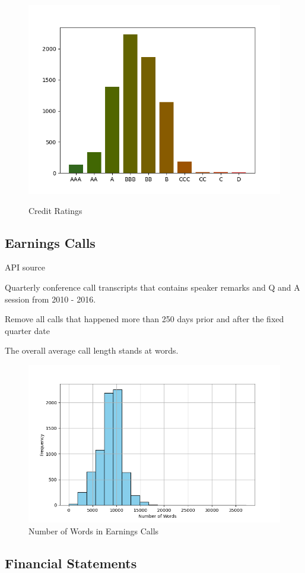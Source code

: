 \documentclass{article}
\begin{document}
    \begin{figure}[h!]
		\centering
        \caption{Credit Ratings}
        \includegraphics[width=0.5\linewidth,keepaspectratio=true]{../Output/All Data EDA/Tabular EDA/Distribution of Rating Issuances_no_title.png}
        \label{fig:credit-ratings}
	\end{figure}

    \subsection*{Earnings Calls}

    API source

    Quarterly conference call transcripts that contains speaker remarks and Q and A session from 2010 - 2016.

    Remove all calls that happened more than 250 days prior and after the fixed quarter date

    The overall average call length stands at \avgCallLength words.

    \begin{figure}[h!]
		\centering
        \caption{Number of Words in Earnings Calls}
        \includegraphics[width=0.5\linewidth,keepaspectratio=true]{../Output/All Data EDA/NLP EDA/all_data_num_words_distribution_no_title.png}
	\end{figure}

    \subsection*{Financial Statements}
\end{document}

